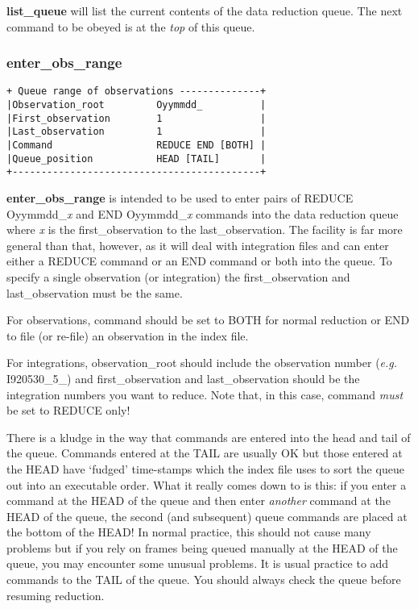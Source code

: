 {{\bf list\_queue} will list the current contents of the data reduction 
queue. The next command to be obeyed is at the {\em top} of this queue.

\subsubsection{enter\_obs\_range}
\label{enter_obs_range}
\begin{verbatim}
+ Queue range of observations --------------+
|Observation_root         Oyymmdd_          |
|First_observation        1                 |
|Last_observation         1                 |
|Command                  REDUCE END [BOTH] |
|Queue_position           HEAD [TAIL]       |
+-------------------------------------------+
\end{verbatim}

{\bf enter\_obs\_range} is intended to be used to enter pairs of
{\sf REDUCE Oyymmdd\_{\em x}} and {\sf END Oyymmdd\_{\em x}} 
commands into the data reduction queue where {\em x} is the 
{\sf first\_observation} to the {\sf last\_observation}. The facility is far 
more general than that, however, as it will deal with integration files 
and can enter either a {\sf REDUCE} command or an {\sf END} command or both
into the queue. To specify a single observation (or integration) 
the {\sf first\_observation} and {\sf last\_observation} must be the same.

For observations, {\sf command} should be set to {\sf BOTH} for normal 
reduction or {\sf END} to file (or re-file) an observation in the index file.

For integrations, {\sf observation\_root} should include the observation
number ({\em e.g.} {\sf I920530\_5\_}) and {\sf first\_observation} and
{\sf last\_observation} should be the integration numbers you want to
reduce. Note that, in this case, {\sf command} {\em must} be set to 
{\sf REDUCE} only!

There is a kludge in the way that commands are entered into the head
and tail of the queue. Commands entered at the TAIL are usually OK but those
entered at the HEAD have `fudged' time-stamps which the index file uses to
sort the queue out into an executable order. What it really comes down to
is this: if you enter a command at the HEAD of the queue and then enter 
{\em another} command at the HEAD of the queue, the second (and subsequent)
queue commands are placed at the bottom of the HEAD! In normal practice,
this should not cause many problems but if you rely on frames being queued
manually at the HEAD of the queue, you may encounter some unusual problems.
It is usual practice to add commands to the TAIL of the queue. You should
always check the queue before resuming reduction.

}
